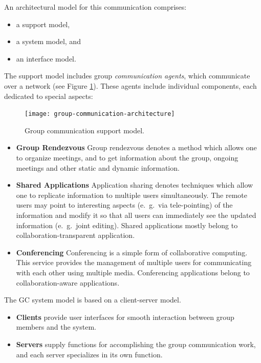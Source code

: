 An architectural model for this communication comprises:
\begin{itemize}
	\item a support model, 
	\item a system model, and 
	\item an interface model.
\end{itemize}

The support model includes group \textit{communication agents}, which communicate over a network (see Figure \ref{fig:group-communication-architecture}). These agents include individual components, each dedicated to special aspects:


\begin{figure}[pht]
	\centering
	\texttt{[image: group-communication-architecture]}
	\caption{Group communication support model.}
	\label{fig:group-communication-architecture}
\end{figure}

\begin{itemize}
	\item \textbf{Group Rendezvous}
	Group rendezvous denotes a method which allows one to organize meetings, and to get information about the group, ongoing meetings and other static and dynamic information.
	
	\item \textbf{Shared Applications}
	Application sharing denotes techniques which allow one to replicate information to multiple users simultaneously. The remote users may point to interesting aspects (e.\ g.\, via tele-pointing) of the information and modify it so that all users can immediately see the updated information (e.\ g.\, joint editing). Shared applications mostly belong to collaboration-transparent application.
	
	\item \textbf{Conferencing}
	Conferencing is a simple form of collaborative computing. This service provides the management of multiple users for communicating with each other using multiple media. Conferencing applications belong to collaboration-aware applications.
\end{itemize}

The GC system model is based on a client-server model. 
\begin{itemize}
	\item \textbf{Clients} provide user interfaces for smooth interaction between group members and the system. 
	
	\item \textbf{Servers} supply functions for accomplishing the group communication work, and each server specializes in its own function.
\end{itemize}


